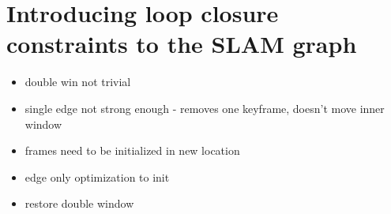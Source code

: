 \section{Introducing loop closure constraints to the SLAM graph}

\begin{itemize}
\itemsep0em
 \item  double win not trivial
 \item single edge not strong enough - removes one keyframe, doesn't move inner window
 \item frames need to be initialized in new location
 \item edge only optimization to init
 \item restore double window
\end{itemize}